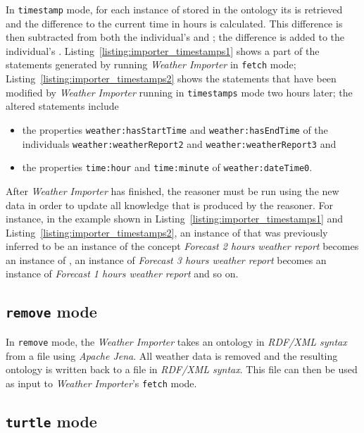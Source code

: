 In \texttt{timestamp} mode, for each instance of  stored in the ontology its  is retrieved and the difference to the current time in hours is calculated. This difference is then subtracted from both the individual's  and ; the difference is added to the individual's . Listing~\ref{listing:importer_timestamps1} shows a part of the statements generated by running \emph{Weather Importer} in \texttt{fetch} mode; Listing~\ref{listing:importer_timestamps2} shows the statements that have been modified by \emph{Weather Importer} running in \texttt{timestamps} mode two hours later; the altered statements include

\begin{itemize}
  \item the properties \texttt{weather:hasStartTime} and \texttt{weather:hasEndTime} of the individuals \texttt{weather:weatherReport2} and \texttt{weather:weatherReport3} and
  \item the properties \texttt{time:hour} and \texttt{time:minute} of \texttt{weather:dateTime0}.
\end{itemize}

After \emph{Weather Importer} has finished, the  reasoner must be run using the new data in order to update all knowledge that is produced by the reasoner. For instance, in the example shown in Listing~\ref{listing:importer_timestamps1} and Listing~\ref{listing:importer_timestamps2}, an instance of  that was previously inferred to be an instance of the concept \emph{Forecast 2 hours weather report} becomes an instance of , an instance of \emph{Forecast 3 hours weather report} becomes an instance of \emph{Forecast 1 hours weather report} and so on.

\subsection{\texttt{remove} mode}

In \texttt{remove} mode, the \emph{Weather Importer} takes an ontology in \emph{RDF/XML syntax} from a file using \emph{Apache Jena}. All weather data is removed and the resulting ontology is written back to a file in \emph{RDF/XML syntax}. This file can then be used as input to \emph{Weather Importer}'s \texttt{fetch} mode.

\subsection{\texttt{turtle} mode}
\label{subsec:importer_turtle}

